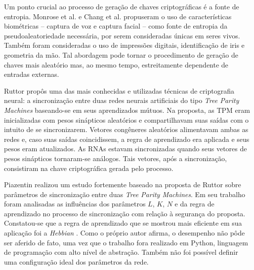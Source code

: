 \documentclass[12pt]{article}
\begin{document}
        Um ponto crucial ao processo de geração de chaves criptográficas é a fonte de entropia. Monrose et al. \cite{monrose2001voice} e Chang et al. \cite{chang2004biometrics} propuseram o uso de características biométricas -- captura de voz e captura facial -- como fonte de entropia da pseudoaleatoriedade necessária, por serem consideradas únicas em seres vivos. Também foram consideradas o uso de impressões digitais, identificação de iris e geometria da mão. Tal abordagem pode tornar o procedimento de geração de chaves mais aleatório mas, ao mesmo tempo, estreitamente dependente de entradas externas.
        
        Ruttor \cite{ruttor2007neural} propôs uma das mais conhecidas e utilizadas técnicas de criptografia neural: a sincronização entre duas redes neurais artificiais do tipo \textit{Tree Parity Machines} baseando-se em seus aprendizados mútuos. Na proposta, as TPM eram inicializadas com pesos sinápticos aleatórios e compartilhavam suas saídas com o intuito de se sincronizarem. Vetores congêneres aleatórios alimentavam ambas as redes e, caso suas saídas coincidissem, a regra de aprendizado era aplicada e seus pesos eram atualizados. As RNAs estavam sincronizadas quando seus vetores de pesos sinápticos tornaram-se análogos. Tais vetores, após a sincronização, consistiram na chave criptográfica gerada pelo processo.
        
        Piazentin \cite{piazentin2011troca} realizou um estudo fortemente baseado na proposta de Ruttor \cite{ruttor2007neural} sobre parâmetros de sincronização entre duas \textit{Tree Parity Machines}. Em seu trabalho foram analisadas as influências dos parâmetros $L$, $K$, $N$ e da regra de aprendizado no processo de sincronização com relação à segurança do proposta. Constatou-se que a regra de aprendizado que se mostrou mais eficiente em sua aplicação foi a \textit{Hebbian} \cite{hebb1949organization}. Como o próprio autor afirma, o desempenho não pôde ser aferido de fato, uma vez que o trabalho fora realizado em Python, linguagem de programação com alto nível de abstração. Também não foi possível definir uma configuração ideal dos parâmetros da rede.
    
\end{document}
